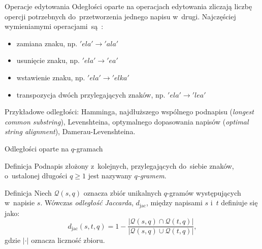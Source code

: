 \documentclass[11pt,pdftex,mathserif]{beamer}
\theoremstyle{definition}
\DeclarePairedDelimiter{\norm}{\lVert}{\rVert}
\begin{document}
\begin{frame}{Operacje edytowania}
Odegłości oparte na operacjach edytowania zliczają liczbę opercji potrzebnych do~przetworzenia jednego napisu w~drugi. Najczęściej wymieniamymi operacjami~są~\cite{Boytsov2011:indexingmethods}:
\begin{itemize}
\item zamiana znaku, np. $'ela' \rightarrow 'ala'$
\item usunięcie znaku, np. $'ela' \rightarrow 'ea'$
\item wstawienie znaku, np. $'ela' \rightarrow 'elka'$
\item transpozycja dwóch przylegających znaków, np. $'ela' \rightarrow 'lea'$
\end{itemize}
\pause
Przykładowe odległości: Hamminga, najdłuższego wspólnego podnapisu (\emph{longest common substring}), Levenshteina, optymalnego dopasowania napisów (\emph{optimal string alignment}), Damerau-Levenshteina.

\end{frame}

\begin{frame}{Odległości oparte na $q$-gramach}
\begin{block}{Definicja}
Podnapis złożony z~kolejnych, przylegających do~siebie znaków, o~ustalonej długości $q\geq 1$ jest nazywany \emph{$q$-gramem}.
\end{block}

\begin{block}{Definicja}
Niech $\mathcal{Q}(s,q)$ oznacza zbiór unikalnych $q$-gramów występujących w~napisie $s$. Wówczas \emph{odległość Jaccarda}, $d_{\mathrm{jac}}$, między napisami $s$ i~$t$ definiuje się jako:
\begin{equation*}
d_{\mathrm{jac}}(s,t,q) = 1 - \frac{|\mathcal{Q}(s,q) \cap \mathcal{Q}(t,q)|}{|\mathcal{Q}(s,q) \cup \mathcal{Q}(t,q)|},
\end{equation*}
gdzie $|\cdot|$ oznacza liczność zbioru.
\end{block} 
\end{frame}


\end{document}
